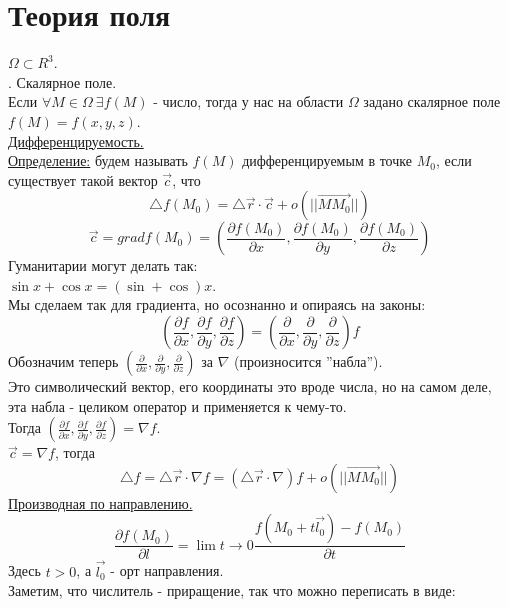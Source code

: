 \documentclass[12pt]{article}
\begin{document}
\section{Теория поля}
$\Omega \subset R^3$.\\
. Скалярное поле.\\
Если $\forall M \in \Omega \ \exists f(M)$ - число, тогда у нас на области $\Omega$ задано скалярное поле $f(M) = f(x,y,z)$.\\
\uline{Дифференцируемость.}\\
\uline{Определение:} будем называть $f(M)$ дифференцируемым в точке $M_0$, если существует такой вектор $\overrightarrow{c}$, что\\
$${\bigtriangleup f}(M_0) = {\bigtriangleup \overrightarrow{r}} \cdot \overrightarrow{c} + o(||\overrightarrow{MM_0}||)$$
$$\overrightarrow{c} = grad f(M_0) = (\frac{\partial f(M_0)}{\partial x}, \frac{\partial f(M_0)}{\partial y}, \frac{\partial f(M_0)}{\partial z})$$
Гуманитарии могут делать так:\\
$\sin x + \cos x = (\sin+\cos)x$.\\
Мы сделаем так для градиента, но осознанно и опираясь на законы:\\
$$(\frac{\partial f}{\partial x},\frac{\partial f}{\partial y}, \frac{\partial f}{\partial z}) = (\frac{\partial}{\partial x},\frac{\partial}{\partial y},\frac{\partial}{\partial z})f$$
Обозначим теперь $(\frac{\partial}{\partial x},\frac{\partial}{\partial y},\frac{\partial}{\partial z})$ за $\nabla$ (произносится ''набла'').\\
Это символический вектор, его координаты это вроде числа, но на самом деле, эта набла - целиком оператор и применяется к чему-то.\\
Тогда $(\frac{\partial f}{\partial x},\frac{\partial f}{\partial y}, \frac{\partial f}{\partial z}) = {\nabla f}$.\\
$\overrightarrow{c} = {\nabla f}$, тогда\\
$${\bigtriangleup f} = {\bigtriangleup \overrightarrow{r}} \cdot {\nabla f} = ({\bigtriangleup \overrightarrow{r}} \cdot {\nabla})f + o(||\overrightarrow{MM_0}||)$$
\uline{Производная по направлению.}\\
$$\frac{\partial f (M_0)}{\partial l} = \lim{t\to 0} \frac{f(M_0+t\overrightarrow{l_0})-f(M_0)}{\partial t}$$
Здесь $t > 0$, а $\overrightarrow{l_0}$ - орт направления.\\
Заметим, что числитель - приращение, так что можно переписать в виде:\\
\end{document}
